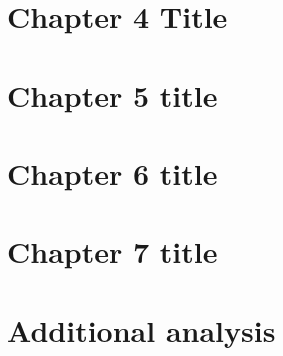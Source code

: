 \documentclass[11pt,twoside]{report} %
\begin{document}


\chapter{Chapter 4 Title}




\chapter{Chapter 5 title}



\chapter{Chapter 6 title}



\chapter{Chapter 7 title}


\appendix
\chapter{Additional analysis}



\end{document}
